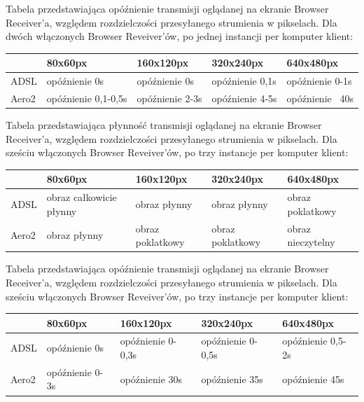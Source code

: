Tabela przedstawiająca opóźnienie transmisji oglądanej na ekranie Browser Receiver'a, względem rozdzielczości przesyłanego strumienia w pikselach. Dla dwóch włączonych Browser Reveiver'ów, po jednej instancji per komputer klient:
\begin{table}[h]
    \centering
    \begin{tabular}{|l|l|l|l|l|}
        \hline
        & 80x60px & 160x120px & 320x240px & 640x480px \\
        \hline
        ADSL
        &
        opóźnienie 0s
        &
        opóźnienie 0s
        &
        opóźnienie 0,1s
        &
        opóźnienie 0-1s \\
        \hline
        Aero2
        &
        opóźnienie 0,1-0,5s
        &
        opóźnienie 2-3s
        &
        opóźnienie 4-5s
        &
        opóźnienie ~40s \\
        \hline
    \end{tabular}
\end{table}

\newpage
Tabela przedstawiająca płynność transmisji oglądanej na ekranie Browser Receiver'a, względem rozdzielczości przesyłanego strumienia w pikselach. Dla sześciu włączonych Browser Reveiver'ów, po trzy instancje per komputer klient:
\begin{table}[h]
    \centering
    \begin{tabular}{|l|l|l|l|l|}
        \hline
        & 80x60px & 160x120px & 320x240px & 640x480px \\
        \hline
        ADSL
        &
        obraz całkowicie płynny 
        &
        obraz płynny
        &
        obraz płynny
        &
        obraz poklatkowy
        \\
        \hline
        Aero2
        &
        obraz płynny
        &
        obraz poklatkowy
        &
        obraz poklatkowy
        &
        obraz nieczytelny
        \\
        \hline
    \end{tabular}
\end{table}

Tabela przedstawiająca opóźnienie transmisji oglądanej na ekranie Browser Receiver'a, względem rozdzielczości przesyłanego strumienia w pikselach. Dla sześciu włączonych Browser Reveiver'ów, po trzy instancje per komputer klient:
\begin{table}[h]
    \centering
    \begin{tabular}{|l|l|l|l|l|}
        \hline
        & 80x60px & 160x120px & 320x240px & 640x480px \\
        \hline
        ADSL
        &
        opóźnienie 0s
        &
        opóźnienie 0-0,3s
        &
        opóźnienie 0-0,5s
        &
        opóźnienie 0,5-2s \\
        \hline
        Aero2
        &
        opóźnienie 0-3s
        &
        opóźnienie 30s
        &
        opóźnienie 35s
        &
        opóźnienie 45s \\
        \hline
    \end{tabular}
\end{table}

